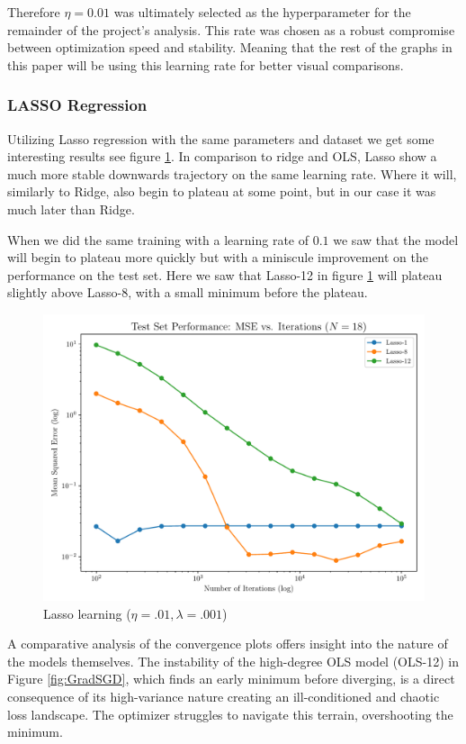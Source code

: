 \documentclass[twocolumn,aps]{revtex4}
\begin{document}
Therefore $\eta=0.01$ was ultimately selected as the hyperparameter for the remainder of the project's analysis. 
This rate was chosen as a robust compromise between optimization speed and stability.
Meaning that the rest of the graphs in this paper will be using this learning rate for better visual comparisons.


\subsubsection{LASSO Regression}
Utilizing Lasso regression with the same parameters and dataset we get some interesting results see figure \ref{fig:Lasso1}.
In comparison to ridge and OLS, Lasso show a much more stable downwards trajectory on the same learning rate.
Where it will, similarly to Ridge, also begin to plateau at some point, but in our case it was much later than Ridge.

When we did the same training with a learning rate of $0.1$ we saw that the model will begin to plateau more quickly but with a miniscule improvement on the performance on the test set. 
Here we saw that Lasso-12 in figure \ref{fig:Lasso1} will plateau slightly above Lasso-8, with a small minimum before the plateau.


\begin{figure}[h]
    \centering
    \includegraphics[width=.95 \linewidth]{Figures/Lasso_MSE.pdf}
    \caption{Lasso learning ($\eta=.01, \lambda=.001$)}
    \label{fig:Lasso1}
\end{figure}

A comparative analysis of the convergence plots offers insight into the nature of the models themselves. The instability of the high-degree OLS model (OLS-12) in Figure \ref{fig:GradSGD}, which finds an early minimum before diverging, is a direct consequence of its high-variance nature creating an ill-conditioned and chaotic loss landscape. 
The optimizer struggles to navigate this terrain, overshooting the minimum.
\end{document}

